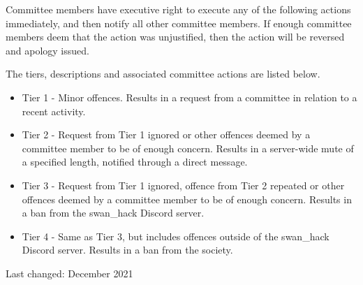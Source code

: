 \documentclass[12pt]{extarticle}
\begin{document}
	Committee members have executive right to execute any of the following actions immediately, and then notify all other committee members. If enough committee members deem that the action was unjustified, then the action will be reversed and apology issued. 
	
	The tiers, descriptions and associated committee actions are listed below.
        \begin{itemize}
	    \item Tier 1 - Minor offences. Results in a request from a committee in relation to a recent activity.
	    \item Tier 2 - Request from Tier 1 ignored or other offences deemed by a committee member to be of enough concern. Results in a server-wide mute of a specified length, notified through a direct message.
	    \item Tier 3 - Request from Tier 1 ignored, offence from Tier 2 repeated or other offences deemed by a committee member to be of enough concern. Results in a ban from the swan\_hack Discord server.
	    \item Tier 4 - Same as Tier 3, but includes offences outside of the swan\_hack Discord server. Results in a ban from the society. 
	\end{itemize}
	    
	\footnotesize Last changed: December 2021 
\end{document}
